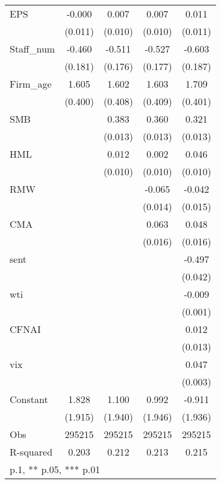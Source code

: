 \begin{table}[]
{\begin{tabular}{@{\extracolsep{2pt}}l*{4}{c}@{}}
EPS & -0.000 & 0.007 & 0.007 & 0.011 \\
 & (0.011) & (0.010) & (0.010) & (0.011) \\
Staff\_num & -0.460\sym{**} & -0.511\sym{***} & -0.527\sym{***} & -0.603\sym{***} \\
 & (0.181) & (0.176) & (0.177) & (0.187) \\
Firm\_age & 1.605\sym{***} & 1.602\sym{***} & 1.603\sym{***} & 1.709\sym{***} \\
 & (0.400) & (0.408) & (0.409) & (0.401) \\
SMB &  & 0.383\sym{***} & 0.360\sym{***} & 0.321\sym{***} \\
 &  & (0.013) & (0.013) & (0.013) \\
HML &  & 0.012 & 0.002 & 0.046\sym{***} \\
 &  & (0.010) & (0.010) & (0.010) \\
RMW &  &  & -0.065\sym{***} & -0.042\sym{***} \\
 &  &  & (0.014) & (0.015) \\
CMA &  &  & 0.063\sym{***} & 0.048\sym{***} \\
 &  &  & (0.016) & (0.016) \\
sent &  &  &  & -0.497\sym{***} \\
 &  &  &  & (0.042) \\
wti &  &  &  & -0.009\sym{***} \\
 &  &  &  & (0.001) \\
CFNAI &  &  &  & 0.012 \\
 &  &  &  & (0.013) \\
vix &  &  &  & 0.047\sym{***} \\
 &  &  &  & (0.003) \\
Constant & 1.828 & 1.100 & 0.992 & -0.911 \\
 & (1.915) & (1.940) & (1.946) & (1.936) \\

\hline
Obs & 295215 & 295215 & 295215 & 295215 \\
R-squared & 0.203 & 0.212 & 0.213 & 0.215 \\
\hline\hline
\multicolumn{5}{l}{\footnotesize * p\sym{<}.1, ** p\sym{<}.05, *** p\sym{<}.01}
\end{tabular}
}
\end{table}